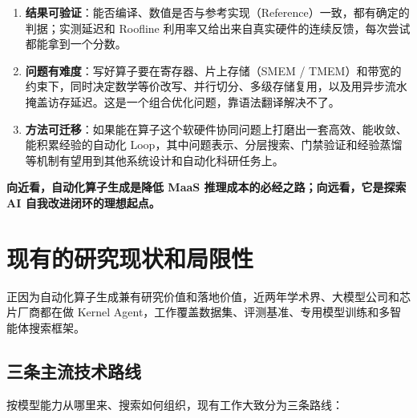 \begin{enumerate}[start=1]
\item
\textbf{结果可验证}：能否编译、数值是否与参考实现（Reference）一致，都有确定的判据；实测延迟和 Roofline 利用率又给出来自真实硬件的连续反馈，每次尝试都能拿到一个分数。


\item
\textbf{问题有难度}：写好算子要在寄存器、片上存储（SMEM / TMEM）和带宽的约束下，同时决定数学等价改写、并行切分、多级存储复用，以及用异步流水掩盖访存延迟。这是一个组合优化问题，靠语法翻译解决不了。


\item
\textbf{方法可迁移}：如果能在算子这个软硬件协同问题上打磨出一套高效、能收敛、能积累经验的自动化 Loop，其中问题表示、分层搜索、门禁验证和经验蒸馏等机制有望用到其他系统设计和自动化科研任务上。


\end{enumerate}


\textbf{向近看，自动化算子生成是降低 MaaS 推理成本的必经之路；向远看，它是探索 AI 自我改进闭环的理想起点。}


\SourceSeparator
\clearpage
\section{现有的研究现状和局限性}\label{sec:landscape}
正因为自动化算子生成兼有研究价值和落地价值，近两年学术界、大模型公司和芯片厂商都在做 Kernel Agent，工作覆盖数据集、评测基准、专用模型训练和多智能体搜索框架。


\subsection{三条主流技术路线}\label{sec:three-routes}
按模型能力从哪里来、搜索如何组织，现有工作大致分为三条路线：


